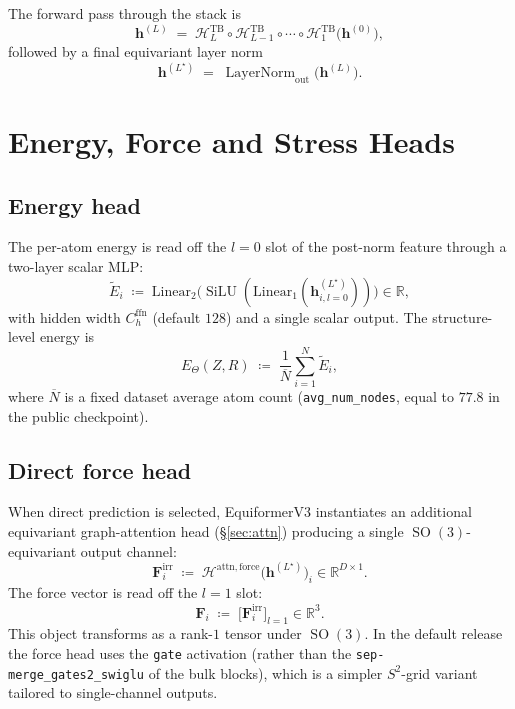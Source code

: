 \documentclass[11pt,a4paper]{article}
\DeclareMathOperator{\SO}{SO}
\DeclareMathOperator{\SiLU}{SiLU}
\DeclareMathOperator{\LN}{LayerNorm}
\newcommand{\R}{\mathbb{R}}
\newcommand{\Sph}{S^2}
\newcommand{\bmF}{\bm{F}}
\newcommand{\bh}{\bm{h}}
\newcommand{\Hb}{\mathcal{H}}
\theoremstyle{plain}
\theoremstyle{definition}
\theoremstyle{remark}
\begin{document}
The forward pass through the stack is
\begin{equation}\label{eq:stack}
    \bh^{(L)}\;=\;\Hb^{\mathrm{TB}}_L\circ\Hb^{\mathrm{TB}}_{L-1}\circ\cdots\circ\Hb^{\mathrm{TB}}_1\bigl(\bh^{(0)}\bigr),
\end{equation}
followed by a final equivariant layer norm
\begin{equation}\label{eq:stack-out}
    \bh^{(L^\star)}\;=\;\LN_{\mathrm{out}}\bigl(\bh^{(L)}\bigr).
\end{equation}

\section{Energy, Force and Stress Heads}\label{sec:heads}

\subsection{Energy head}\label{sec:energy}

The per-atom energy is read off the $l=0$ slot of the post-norm feature through
a two-layer scalar MLP:
\begin{equation}\label{eq:energy-mlp}
    \widetilde E_i\;\coloneqq\;\mathrm{Linear}_2\bigl(\SiLU(\mathrm{Linear}_1(\bh^{(L^\star)}_{i,l=0}))\bigr)\in\R,
\end{equation}
with hidden width $C_h^{\mathrm{ffn}}$ (default $128$) and a single scalar output.
The structure-level energy is
\begin{equation}\label{eq:energy-sum}
    E_\Theta(Z,R)\;\coloneqq\;\frac{1}{\overline N}\sum_{i=1}^{N}\widetilde E_i,
\end{equation}
where $\overline N$ is a fixed dataset average atom count (\texttt{avg\_num\_nodes}, equal to $77.8$ in the public checkpoint).

\subsection{Direct force head}\label{sec:force-direct}

When direct prediction is selected, EquiformerV3 instantiates an additional
equivariant graph-attention head (\S\ref{sec:attn}) producing a single
$\SO(3)$-equivariant output channel:
\begin{equation}\label{eq:force-head}
    \bm{F}_i^{\mathrm{irr}}\;\coloneqq\;\Hb^{\mathrm{attn,force}}\bigl(\bh^{(L^\star)}\bigr)_i\in\R^{D\times 1}.
\end{equation}
The force vector is read off the $l=1$ slot:
\begin{equation}\label{eq:force-l1}
    \bmF_i\;\coloneqq\;\bigl[\bm{F}_i^{\mathrm{irr}}\bigr]_{l=1}\in\R^3.
\end{equation}
This object transforms as a rank-$1$ tensor under $\SO(3)$.
In the default release the force head uses the \texttt{gate} activation (rather than the \texttt{sep-merge\_gates2\_swiglu} of the bulk blocks), which is a simpler $\Sph$-grid variant tailored to single-channel outputs.
\end{document}
